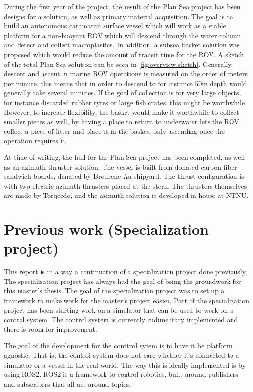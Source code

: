\documentclass[class=article, crop=false]{standalone}
\begin{document}
During the first year of the project, the result of the Plan Sea project has been designs for a solution, as well as primary material acquisition. The goal is to build an autonomous catamaran surface vessel which will work as a stable platform for a non-buoyant ROV which will descend through the water column and detect and collect macroplastics. In addition, a subsea basket solution was proposed which would reduce the amount of transit time for the ROV. A sketch of the total Plan Sea solution can be seen in \cref{fig:overview-sketch}. Generally, descent and ascent in marine ROV operations is measured on the order of meters per minute, this means that in order to descend to for instance 50m depth would generally take several minutes. If the goal of collection is for very large objects, for instance discarded rubber tyres or large fish crates, this might be worthwhile. However, to increase flexibility, the basket would make it worthwhile to collect smaller pieces as well, by having a place to return to underwater lets the ROV collect a piece of litter and place it in the basket, only ascending once the operation requires it.


At time of writing, the hull for the Plan Sea project has been completed, as well as an azimuth thruster solution. The vessel is built from donated carbon fiber sandwich boards, donated by Brødrene Aa shipyard. The thrust configuration is with two electric azimuth thrusters placed at the stern. The thrusters themselves are made by Torqeedo, and the azimuth solution is developed in-house at NTNU.

\section{Previous work (Specialization project)}

This report is in a way a continuation of a specialization project\cite{specialization} done previously. The specialization project has always had the goal of being the groundwork for this master's thesis. The goal of the specialization project was to set up a framework to make work for the master's project easier. Part of the specialization project has been starting work on a simulator that can be used to work on a control system. The control system is currently rudimentary implemented and there is room for improvement.

The goal of the development for the conttrol sytem is to have it be platform agnostic. That is, the control system does not care whether it's connected to a simulator or a vessel in the real world. The way this is ideally implemented is by using ROS2. ROS2 is a framework to control robotics, built around publishers and subscribers that all act around topics.
\end{document}
